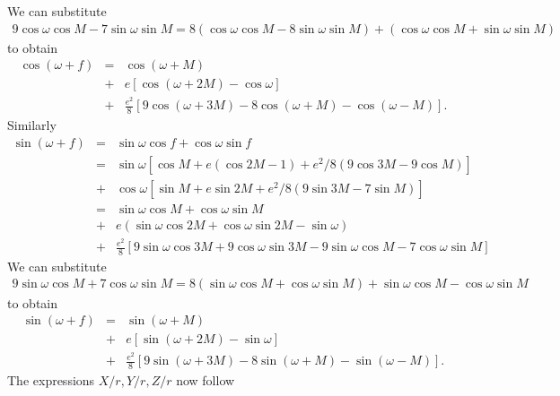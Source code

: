 \documentclass [12pt, a4paper] {article}
\begin{document}
We can substitute
\begin {eqnarray}
    9\cos\omega\cos M - 7\sin\omega\sin M 
    = 8(\cos\omega\cos M - 8\sin\omega\sin M) + (\cos\omega\cos M + \sin\omega\sin M)
\end {eqnarray}
to obtain 
\begin {eqnarray}
    \cos(\omega + f)
    &=& 
    \cos (\omega + M) 
    \\\nonumber
    &+& e [\cos(\omega + 2M) - \cos\omega]
    \\\nonumber
    &+& 
    \frac{e^2}{8}
    \left[
        9\cos(\omega + 3M) - 8 \cos(\omega + M) - \cos(\omega - M)
    \right].
\end {eqnarray}
Similarly 
\begin {eqnarray}
    \sin(\omega + f)
    &=&
    \sin\omega\cos f + \cos\omega\sin f
    \\
    &=&
    \sin\omega[\cos M + e(\cos 2M - 1) + e^2/8(9\cos 3M - 9 \cos M)] 
    \\\nonumber
    &+& 
    \cos\omega[\sin M + e\sin 2M + e^2/8(9\sin 3M - 7\sin M)]
    \\
    &=& 
    \sin\omega\cos M + \cos\omega\sin M 
    \\\nonumber 
    &+&
    e\left(
        \sin\omega\cos 2M + \cos\omega\sin 2M - \sin\omega
    \right)
    \\\nonumber 
    &+&
    \frac{e^2}{8}
    \left[
        9\sin\omega\cos 3M + 9\cos\omega\sin 3M 
        -9\sin\omega\cos M - 7\cos\omega\sin M 
    \right]
\end {eqnarray}
We can substitute 
\begin {eqnarray}
    9\sin\omega\cos M + 7\cos\omega\sin M 
    = 
    8(\sin\omega\cos M + \cos\omega\sin M)
    +
    \sin\omega\cos M - \cos\omega\sin M
\end {eqnarray}
to obtain 
\begin {eqnarray}
    \sin(\omega + f)
    &=& 
    \sin(\omega + M)
    \\\nonumber 
    &+& 
    e[\sin(\omega + 2M) - \sin\omega] 
    \\\nonumber 
    &+&
    \frac{e^2}{8}
    \left[
        9\sin(\omega + 3M) - 8\sin(\omega + M) - \sin(\omega - M)
    \right].
\end {eqnarray}
The expressions $X/r, Y/r, Z/r$ now follow 
\end{document}
